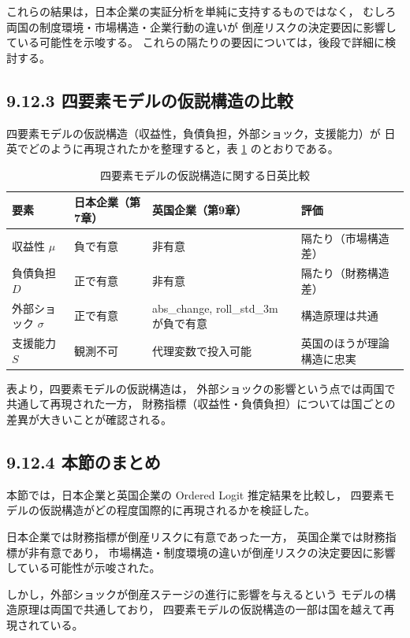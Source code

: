 これらの結果は，日本企業の実証分析を単純に支持するものではなく，
むしろ両国の制度環境・市場構造・企業行動の違いが
倒産リスクの決定要因に影響している可能性を示唆する。
これらの隔たりの要因については，後段で詳細に検討する。

\subsection*{9.12.3 四要素モデルの仮説構造の比較}

四要素モデルの仮説構造（収益性，負債負担，外部ショック，支援能力）が
日英でどのように再現されたかを整理すると，表 \ref{tab:jp_uk_comparison} のとおりである。

\begin{table}[H]
\centering
\caption{四要素モデルの仮説構造に関する日英比較}
\label{tab:jp_uk_comparison}
\begin{tabular}{l p{3.2cm} p{4.2cm} p{3.5cm}}
\hline
要素 & 日本企業（第7章） & 英国企業（第9章） & 評価 \\
\hline
収益性 $\mu$ & 負で有意 & 非有意 & 隔たり（市場構造差） \\
負債負担 $D$ & 正で有意 & 非有意 & 隔たり（財務構造差） \\
外部ショック $\sigma$ & 正で有意 & abs\_change, roll\_std\_3m が負で有意 & 構造原理は共通 \\
支援能力 $S$ & 観測不可 & 代理変数で投入可能 & 英国のほうが理論構造に忠実 \\
\hline
\end{tabular}
\end{table}


表より，四要素モデルの仮説構造は，
外部ショックの影響という点では両国で共通して再現された一方，
財務指標（収益性・負債負担）については国ごとの差異が大きいことが確認される。

\subsection*{9.12.4 本節のまとめ}

本節では，日本企業と英国企業の Ordered Logit 推定結果を比較し，
四要素モデルの仮説構造がどの程度国際的に再現されるかを検証した。

日本企業では財務指標が倒産リスクに有意であった一方，
英国企業では財務指標が非有意であり，
市場構造・制度環境の違いが倒産リスクの決定要因に影響している可能性が示唆された。

しかし，外部ショックが倒産ステージの進行に影響を与えるという
モデルの構造原理は両国で共通しており，
四要素モデルの仮説構造の一部は国を越えて再現されている。

